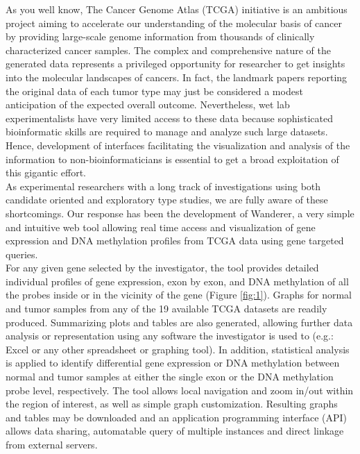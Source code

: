 \documentclass[a4paper,english]{article}
\begin{document}
As you well know, The Cancer Genome Atlas (TCGA) initiative is an ambitious project aiming to accelerate our understanding of the molecular basis of cancer by providing large-scale genome information from thousands of clinically characterized cancer samples. The complex and comprehensive  nature of the generated data represents a privileged opportunity for researcher to get insights into the molecular landscapes of cancers. In fact, the landmark papers reporting the original data of each tumor type may just be considered a modest anticipation of the expected overall outcome. Nevertheless,  wet lab experimentalists have very limited access to these data because sophisticated bioinformatic skills are required to manage and analyze such large datasets. Hence, development of interfaces facilitating the visualization and analysis of the information to non-bioinformaticians is essential to get a broad exploitation of this gigantic effort.\\

As experimental researchers with a long track of investigations using both candidate oriented and exploratory type studies, we are fully aware of these shortcomings. Our response has been the development of Wanderer, a very simple and intuitive web tool allowing real time access and visualization of gene expression and DNA methylation profiles from TCGA data using gene targeted queries.\\

For any given gene selected by the investigator, the tool provides detailed individual profiles of gene expression, exon by exon, and DNA methylation of all the probes inside or in the vicinity of the gene (Figure \ref{fig:1}). Graphs for normal and tumor samples from any of the 19 available TCGA datasets are readily produced. Summarizing plots and tables are also generated, allowing further data analysis or representation using any software the investigator is used to (e.g.: Excel or any other spreadsheet or graphing tool). In addition, statistical analysis is applied to identify differential gene expression or DNA methylation between normal and tumor samples at either the single exon or the DNA methylation probe level, respectively. The tool allows local navigation and zoom in/out within the region of interest, as well as simple graph customization. Resulting graphs and tables may be downloaded and an application programming interface (API) allows data sharing, automatable query of multiple instances and direct linkage from external servers.\\
 
\end{document}
